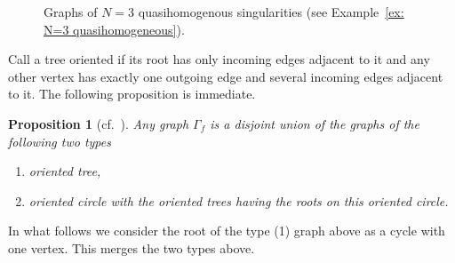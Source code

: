 \documentclass[10pt,a4paper]{article}
\numberwithin{equation}{section}
\newtheorem{Proposition}[Theorem]{Proposition}
 { \theoremstyle{definition}
\newtheorem{Definition}[Theorem]{Definition}
\newtheorem{Note}[Theorem]{Note}
\newtheorem{Example}[Theorem]{Example}
\newtheorem{Remark}[Theorem]{Remark} }
\begin{document}
\begin{figure}[t]
	\centering
{}
 \caption{Graphs of $N=3$ quasihomogenous singularities (see Example~\ref{ex: N=3 quasihomogeneous}).}
 \label{fig: N=3 graphs}
\end{figure}

Call a tree oriented if its root has only incoming edges adjacent to it and any other vertex has exactly one outgoing edge and several incoming edges adjacent to it.
The following proposition is immediate.~
\begin{Proposition}[{cf.\ \cite[Lemma 3.1]{HK}}]\label{prop: graph of f}
	Any graph $\Gamma_f$ is a disjoint union of the graphs of the following two types
	\begin{enumerate}\itemsep=0pt
	 \item[$(1)$] oriented tree,
	 \item[$(2)$] oriented circle with the oriented trees having the roots on this oriented circle.
	\end{enumerate}
\end{Proposition}

In what follows we consider the root of the type (1) graph above as a cycle with one vertex. This merges the two types above.
\end{document}
